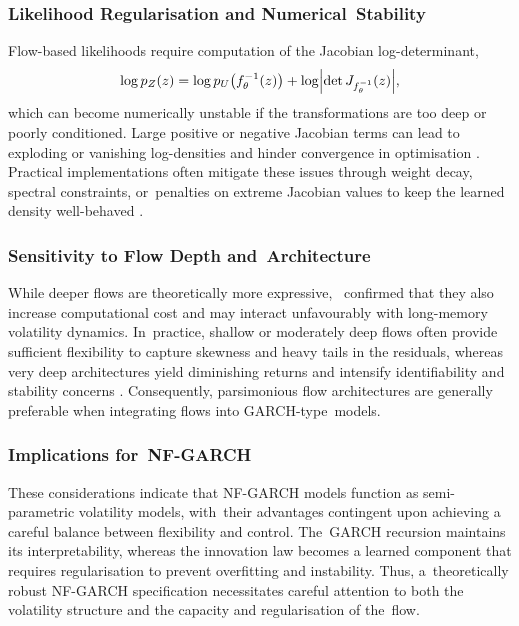 \documentclass[risks,article,accept,pdftex,moreauthors]{Definitions/mdpi}
\begin{document}
\subsubsection{Likelihood Regularisation and Numerical~Stability}
Flow-based likelihoods require computation of the Jacobian log-determinant,
\[
\log p_Z(z) = \log p_U\big(f^{-1}_\theta(z)\big)
             + \log \Bigl|\det J_{f^{-1}_\theta}(z)\Bigr|,
\]
which can become numerically unstable if the transformations are too deep or poorly conditioned. Large positive or negative Jacobian terms can lead to exploding or vanishing log-densities and hinder convergence in optimisation \citep{papamakarios2021normalizing}. Practical implementations often mitigate these issues through weight decay, spectral constraints, or~penalties on extreme Jacobian values to keep the learned density well-behaved \citep{papamakarios2021normalizing}.

\subsubsection{Sensitivity to Flow Depth and~Architecture}
While deeper flows are theoretically more expressive,~\cite{papamakarios2021normalizing} confirmed that they also increase computational cost and may interact unfavourably with long-memory volatility dynamics. In~practice, shallow or moderately deep flows often provide sufficient flexibility to capture skewness and heavy tails in the residuals, whereas very deep architectures yield diminishing returns and intensify identifiability and stability concerns \citep{liu2020flows}. Consequently, parsimonious flow architectures are generally preferable when integrating flows into GARCH-type~models.

\subsubsection{Implications for~NF-GARCH}
These considerations indicate that NF-GARCH models function as semi-parametric volatility models, with~their advantages contingent upon achieving a careful balance between flexibility and control. The~GARCH recursion maintains its interpretability, whereas the innovation law becomes a learned component that requires regularisation to prevent overfitting and instability. Thus, a~theoretically robust NF-GARCH specification necessitates careful attention to both the volatility structure and the capacity and regularisation of the~flow.

\end{document}
